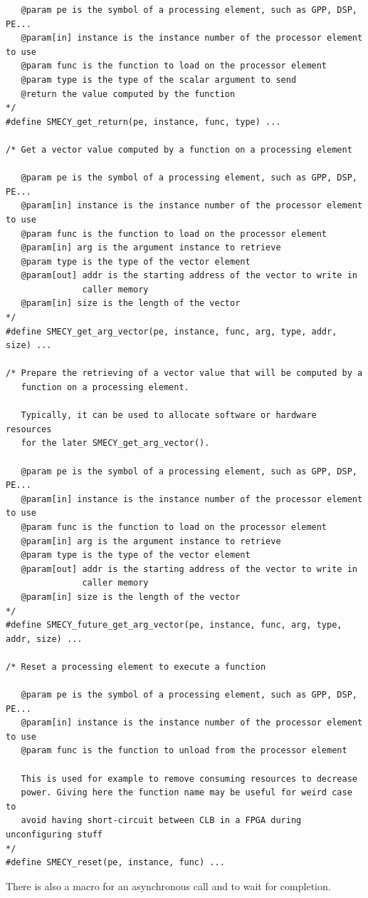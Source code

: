 \documentclass[a4paper]{article}
\begin{document}
\begin{lstlisting}
   @param pe is the symbol of a processing element, such as GPP, DSP, PE...
   @param[in] instance is the instance number of the processor element to use
   @param func is the function to load on the processor element
   @param type is the type of the scalar argument to send
   @return the value computed by the function
*/
#define SMECY_get_return(pe, instance, func, type) ...

/* Get a vector value computed by a function on a processing element

   @param pe is the symbol of a processing element, such as GPP, DSP, PE...
   @param[in] instance is the instance number of the processor element to use
   @param func is the function to load on the processor element
   @param[in] arg is the argument instance to retrieve
   @param type is the type of the vector element
   @param[out] addr is the starting address of the vector to write in
               caller memory
   @param[in] size is the length of the vector
*/
#define SMECY_get_arg_vector(pe, instance, func, arg, type, addr, size) ...

/* Prepare the retrieving of a vector value that will be computed by a
   function on a processing element.

   Typically, it can be used to allocate software or hardware resources
   for the later SMECY_get_arg_vector().

   @param pe is the symbol of a processing element, such as GPP, DSP, PE...
   @param[in] instance is the instance number of the processor element to use
   @param func is the function to load on the processor element
   @param[in] arg is the argument instance to retrieve
   @param type is the type of the vector element
   @param[out] addr is the starting address of the vector to write in
               caller memory
   @param[in] size is the length of the vector
*/
#define SMECY_future_get_arg_vector(pe, instance, func, arg, type, addr, size) ...

/* Reset a processing element to execute a function

   @param pe is the symbol of a processing element, such as GPP, DSP, PE...
   @param[in] instance is the instance number of the processor element to use
   @param func is the function to unload from the processor element

   This is used for example to remove consuming resources to decrease
   power. Giving here the function name may be useful for weird case to
   avoid having short-circuit between CLB in a FPGA during unconfiguring stuff
*/
#define SMECY_reset(pe, instance, func) ...
\end{lstlisting}
There is also a macro for an asynchronous call and to wait for completion.
\end{document}
